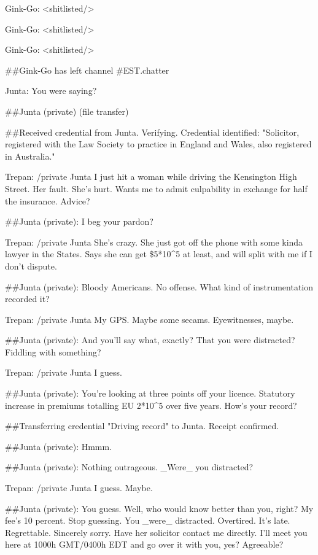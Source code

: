 {Gink-Go: \textless{}shitlisted/\textgreater{}

Gink-Go: \textless{}shitlisted/\textgreater{}

Gink-Go: \textless{}shitlisted/\textgreater{}

\#\#Gink-Go has left channel \#EST.chatter

Junta: You were saying?

\#\#Junta (private) (file transfer)

\#\#Received credential from Junta. Verifying. Credential
identified: "Solicitor, registered with the Law Society to practice
in England and Wales, also registered in Australia."

Trepan: /private Junta I just hit a woman while driving the
Kensington High Street. Her fault. She's hurt. Wants me to admit
culpability in exchange for half the insurance. Advice?

\#\#Junta (private): I beg your pardon?

Trepan: /private Junta She's crazy. She just got off the phone with
some kinda lawyer in the States. Says she can get \$5*10\^{}5 at
least, and will split with me if I don't dispute.

\#\#Junta (private): Bloody Americans. No offense. What kind of
instrumentation recorded it?

Trepan: /private Junta My GPS. Maybe some secams. Eyewitnesses,
maybe.

\#\#Junta (private): And you'll say what, exactly? That you were
distracted? Fiddling with something?

Trepan: /private Junta I guess.

\#\#Junta (private): You're looking at three points off your
licence. Statutory increase in premiums totalling EU 2*10\^{}5 over
five years. How's your record?

\#\#Transferring credential "Driving record" to Junta. Receipt
confirmed.

\#\#Junta (private): Hmmm.

\#\#Junta (private): Nothing outrageous. \_Were\_ you distracted?

Trepan: /private Junta I guess. Maybe.

\#\#Junta (private): You guess. Well, who would know better than
you, right? My fee's 10 percent. Stop guessing. You \_were\_
distracted. Overtired. It's late. Regrettable. Sincerely sorry.
Have her solicitor contact me directly. I'll meet you here at 1000h
GMT/0400h EDT and go over it with you, yes? Agreeable?

}
